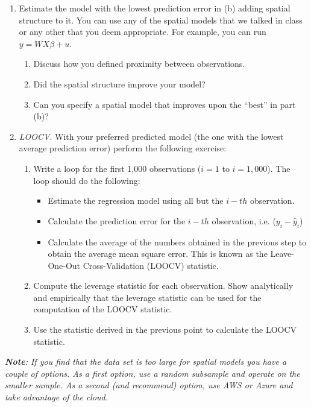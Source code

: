 \documentclass[12pt,onecolumn]{article}
\begin{document}
\begin{enumerate}
\begin{enumerate}
  \item Estimate the  model with the lowest prediction error in (b) adding spatial structure to it. You can use any of the spatial models that we talked in class or any other that you deem appropriate. For example, you can run $y=WX\beta +u$. 
  \begin{enumerate}
    \item Discuss how you defined proximity between observations. 
    \item Did the spatial structure improve your model? 
    \item Can you specify a spatial model that improves upon the ``best'' in part (b)?
  \end{enumerate}
  \item {\it LOOCV}. With your preferred predicted model (the one with the lowest average prediction error) perform the following exercise:
    \begin{enumerate}
      \item Write a loop for  the first 1,000 observations ($i = 1$ to $i = 1,000$). The loop should do the following:
      \begin{itemize}
        \item Estimate the regression model using all but the $i-th$ observation.
        \item Calculate the prediction error for the $i-th$ observation, i.e. ($y_i-\hat y_i$)
        \item Calculate the average of the numbers obtained in the previous step to obtain the average mean square error. This is known as the Leave-One-Out Cross-Validation (LOOCV) statistic.
      \end{itemize}
        \item Compute the leverage statistic for each observation. Show analytically and empirically that the leverage statistic can be used for the computation of the LOOCV statistic.
        \item Use the statistic derived in the previous point to calculate the LOOCV statistic.
\end{enumerate}
\end{enumerate}
  \end{enumerate}
  {\it {\bf Note}: If you find that the data set is too large for spatial models you have a couple of options. As a first option, use a random subsample and operate on the smaller sample. As a second (and recommend) option, use  AWS or Azure and take advantage of the cloud.}
\end{document}
